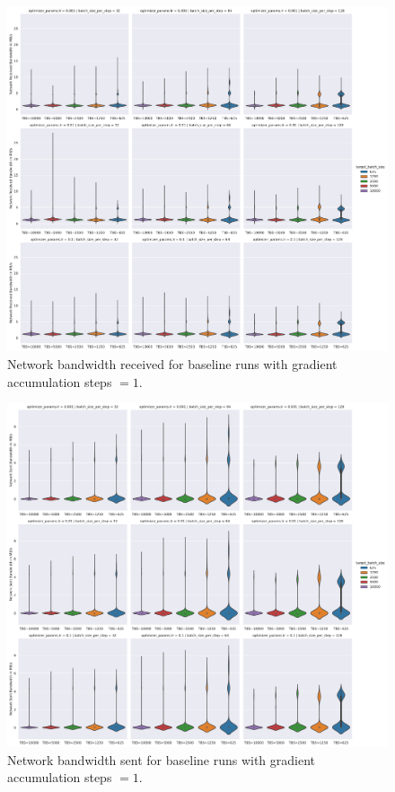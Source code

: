 \begin{figure}[h]
    \centering
    \caption{Network bandwidth received for baseline runs with gradient accumulation steps $=1$.}
    \label{fig:net-recv_UL-1_GAS-1}
    \includegraphics[width=\textwidth]{./figures/06_net-recv-sys-bandwidth-mbs_use-local-updates_true-GAS-1.pdf}
\end{figure}

\begin{figure}[h]
    \centering
    \caption{Network bandwidth sent for baseline runs with gradient accumulation steps $=1$.}
    \label{fig:net-sent_UL-1_GAS-1}
    \includegraphics[width=\textwidth]{./figures/06_net-sent-sys-bandwidth-mbs_use-local-updates_true-GAS-1.pdf}
\end{figure}

